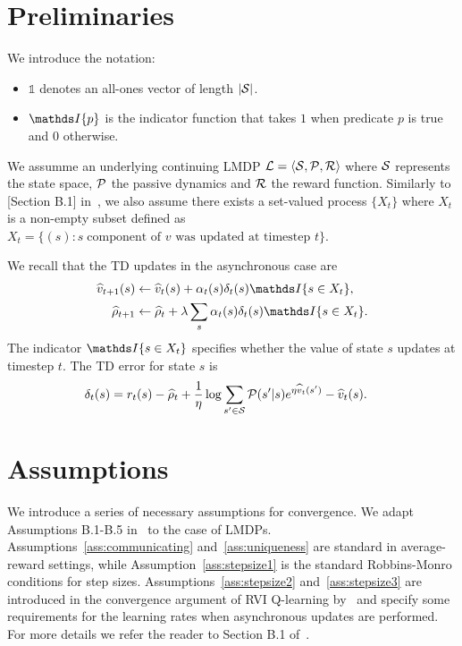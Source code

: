 \label{proof:theo_almdps}
\section{Preliminaries}
We introduce the notation:
\begin{itemize}
    \item $\mathds{1}$ denotes an all-ones vector of length $\lvert\mathcal{S}\rvert$.
    \item $\indicator{p}$ is the indicator function that takes $1$ when predicate $p$ is true and $0$ otherwise.
\end{itemize}

We assumme an underlying continuing LMDP $\mathcal{L}=\langle\mathcal{S},\mathcal{P},\mathcal{R}\rangle$ where $\mathcal{S}$ represents the state space, $\mathcal{P}$ the passive dynamics and $\mathcal{R}$ the reward function. Similarly to [Section B.1] in~\cite{Wan2021}, we also assume there exists a set-valued process $\{X_t\}$ where $X_t$ is a non-empty subset defined as ${X_t = \{ (s) : s\;\text{component of $v$ was updated at timestep $t$} \}}$.

We recall that the TD updates in the asynchronous case are 
\begin{align}
\widehat{v}_{t+1}(s) &\gets \widehat{v}_t(s) + \alpha_t(s) \delta_t(s) \indicator{s\in X_t},\label{eq:updatev}\\
\widehat{\rho}_{t+1} &\gets \widehat{\rho}_t + \lambda \sum_s \alpha_t(s) \delta_t(s) \indicator{s\in X_t}.\label{eq:updaterho}
\end{align}
The indicator $\indicator{s\in X_t}$ specifies whether the value of state $s$ updates at timestep $t$. The TD error for state $s$ is
\begin{align*}
\delta_t(s) %
 &= r_t(s) - \widehat{\rho}_t + \frac 1 \eta \log \sum_{s'\in\cS} \cP(s'|s) e^{\eta \widehat{v}_t(s')} - \widehat{v}_t(s).
\end{align*}
\section{Assumptions}
We introduce a series of necessary assumptions for convergence. We adapt Assumptions B.1-B.5 in~\cite{Wan2021} to the case of LMDPs. Assumptions~\ref{ass:communicating} and~\ref{ass:uniqueness} are standard in average-reward settings, while Assumption~\ref{ass:stepsize1} is the standard Robbins-Monro conditions for step sizes. Assumptions~\ref{ass:stepsize2} and~\ref{ass:stepsize3} are introduced in the convergence argument of RVI Q-learning by~\citet{Borkar1998} and specify some requirements for the learning rates when asynchronous updates are performed. For more details we refer the reader to Section B.1 of~\cite{Wan2021}.

